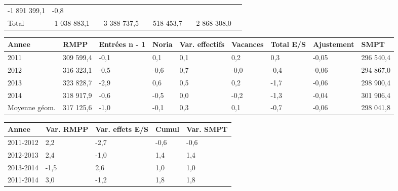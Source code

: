 \begin{longtable}[]{@{}lllllllll@{}}
\begin{minipage}[t]{0.10\columnwidth}
-1 891 399,1\strut
\end{minipage} & \begin{minipage}[t]{0.06\columnwidth}\raggedright
-0,8\strut
\end{minipage}\tabularnewline
\begin{minipage}[t]{0.05\columnwidth}\raggedright
Total\strut
\end{minipage} & \begin{minipage}[t]{0.10\columnwidth}\raggedright
-1 038 883,1\strut
\end{minipage} & \begin{minipage}[t]{0.06\columnwidth}\raggedright
\strut
\end{minipage} & \begin{minipage}[t]{0.16\columnwidth}\raggedright
3 388 737,5\strut
\end{minipage} & \begin{minipage}[t]{0.06\columnwidth}\raggedright
\strut
\end{minipage} & \begin{minipage}[t]{0.12\columnwidth}\raggedright
518 453,7\strut
\end{minipage} & \begin{minipage}[t]{0.06\columnwidth}\raggedright
\strut
\end{minipage} & \begin{minipage}[t]{0.10\columnwidth}\raggedright
2 868 308,0\strut
\end{minipage} & \begin{minipage}[t]{0.06\columnwidth}\raggedright
\strut
\end{minipage}\tabularnewline
\bottomrule
\end{longtable}

\begin{longtable}[]{@{}lllllllll@{}}
\toprule
Annee & RMPP & Entrées n - 1 & Noria & Var. effectifs & Vacances & Total
E/S & Ajustement & SMPT\tabularnewline
\midrule
\endhead
2011 & 309 599,4 & -0,1 & 0,1 & 0,1 & 0,2 & 0,3 & -0,05 & 296
540,4\tabularnewline
2012 & 316 323,1 & -0,5 & -0,6 & 0,7 & -0,0 & -0,4 & -0,06 & 294
867,0\tabularnewline
2013 & 323 828,7 & -2,9 & 0,6 & 0,5 & 0,2 & -1,7 & -0,06 & 298
900,4\tabularnewline
2014 & 318 917,9 & -0,6 & -0,5 & 0,0 & -0,2 & -1,3 & -0,04 & 301
906,4\tabularnewline
Moyenne géom. & 317 125,6 & -1,0 & -0,1 & 0,3 & 0,1 & -0,7 & -0,06 & 298
041,8\tabularnewline
\bottomrule
\end{longtable}

\begin{longtable}[]{@{}lllll@{}}
\toprule
Annee & Var. RMPP & Var. effets E/S & Cumul & Var. SMPT\tabularnewline
\midrule
\endhead
2011-2012 & 2,2 & -2,7 & -0,6 & -0,6\tabularnewline
2012-2013 & 2,4 & -1,0 & 1,4 & 1,4\tabularnewline
2013-2014 & -1,5 & 2,6 & 1,0 & 1,0\tabularnewline
2011-2014 & 3,0 & -1,2 & 1,8 & 1,8\tabularnewline
\bottomrule
\end{longtable}


